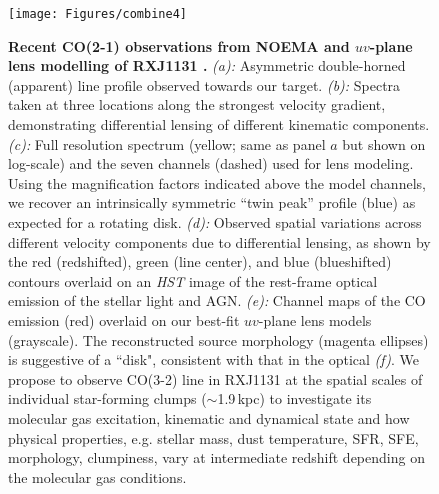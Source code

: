 \documentclass[11pt,a4paper,twoside,graphicx,color]{article}
\newcommand{\bco}{\mbox{CO(2-1)}\xspace}
\newcommand{\cco}{\mbox{CO(3-2)}\xspace}
\newcommand{\kms}{km\,s$^{-1}$\xspace}
\newcommand{\interz}{intermediate-$z$\xspace}
\newcommand{\obs}{observations\xspace}
\begin{document}
\begin{figure}[htbp]
\begin{center}
\texttt{[image: Figures/combine4]}
\caption{
\textbf{Recent \bco \obs from NOEMA and $uv$-plane lens modelling of RXJ1131 \citep{Leung16b}.}
{\em (a):}
Asymmetric double-horned (apparent) line profile observed towards our target.
{\em (b):}
Spectra taken at three locations along the strongest velocity gradient,
demonstrating
differential lensing of different kinematic components.
{\em (c):}
Full resolution spectrum (yellow; same as panel $a$ but shown on log-scale) and the seven channels (dashed) used for lens modeling.
Using the magnification factors indicated above the model channels, we recover an intrinsically symmetric
``twin peak'' profile (blue) as expected for a rotating disk.
{\em (d):}
Observed spatial variations across different velocity components due to
differential lensing,
as shown by the red (redshifted),
green (line center), and blue (blueshifted) contours overlaid on an
{\em HST} image of the rest-frame optical emission of the stellar light and AGN.
{\em (e):}
Channel maps of the CO emission (red)
overlaid on our best-fit $uv$-plane lens models (grayscale).
The reconstructed source morphology (magenta ellipses) is suggestive of a ``disk",
consistent with that in the optical {\em (f)}.
We propose to observe \cco line in RXJ1131 at the spatial scales of individual star-forming clumps ($\sim$1.9\,kpc)
to
investigate
its molecular gas excitation, kinematic and dynamical state and how
physical properties, e.g. stellar mass, dust temperature, SFR, SFE, morphology, clumpiness,
vary at intermediate redshift depending on the molecular gas conditions.
\label{fig:combine}}
\vspace{-2.15em}
\end{center}
\end{figure}

\clearpage

\end{document}
